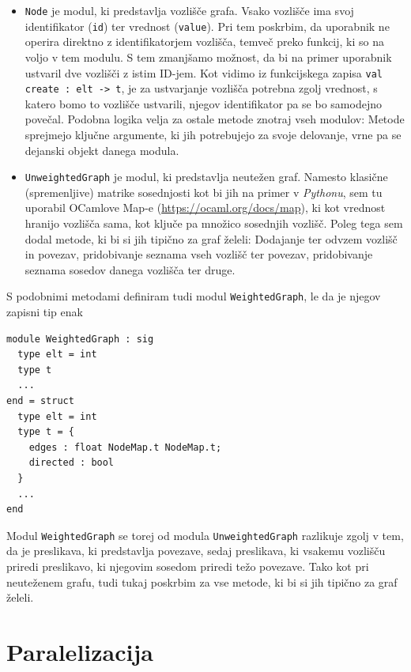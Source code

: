 \documentclass[mat1, tisk]{fmfdelo}
\begin{document}
\begin{itemize}
  \item \texttt{Node} je modul, ki predstavlja vozlišče grafa. 
    Vsako vozlišče ima svoj identifikator (\texttt{id}) ter vrednost (\texttt{value}). Pri tem poskrbim, da uporabnik ne 
    operira direktno z identifikatorjem vozlišča, temveč preko funkcij, ki so na voljo v tem modulu.
    S tem zmanjšamo možnost, da bi na primer uporabnik ustvaril dve vozlišči z istim ID-jem. 
    Kot vidimo iz funkcijskega zapisa \texttt{val create : elt -> t}, je za ustvarjanje vozlišča potrebna zgolj vrednost,
    s katero bomo to vozlišče ustvarili, njegov identifikator pa se bo samodejno povečal. Podobna logika velja za ostale
    metode znotraj vseh modulov: Metode sprejmejo ključne argumente, ki jih potrebujejo za svoje delovanje,
    vrne pa se dejanski objekt danega modula.
  \item \texttt{UnweightedGraph} je modul, ki predstavlja neutežen graf. 
    Namesto klasične (spremenljive) matrike sosednjosti kot bi jih na primer v \textit{Pythonu}, sem tu uporabil
    OCamlove Map-e (\url{https://ocaml.org/docs/map}), ki kot vrednost hranijo vozlišča sama, kot ključe pa množico
    sosednjih vozlišč. 
    Poleg tega sem dodal metode, ki bi si jih tipično za graf želeli: Dodajanje ter odvzem
    vozlišč in povezav, pridobivanje seznama vseh vozlišč ter povezav, pridobivanje seznama sosedov danega vozlišča
    ter druge.    

\end{itemize}

S podobnimi metodami definiram tudi modul \texttt{WeightedGraph}, le da je njegov zapisni
tip enak
\begin{lstlisting}
module WeightedGraph : sig
  type elt = int
  type t
  ...
end = struct
  type elt = int
  type t = {
    edges : float NodeMap.t NodeMap.t; 
    directed : bool
  }
  ...
end
\end{lstlisting}

Modul \texttt{WeightedGraph} se torej od modula \texttt{UnweightedGraph} razlikuje zgolj v tem, da je preslikava, ki
predstavlja povezave, sedaj preslikava, ki vsakemu vozlišču priredi preslikavo, ki njegovim sosedom priredi težo povezave.
Tako kot pri neuteženem grafu, tudi tukaj poskrbim za vse metode, ki bi si jih tipično za graf želeli.

\section{Paralelizacija}
\end{document}
